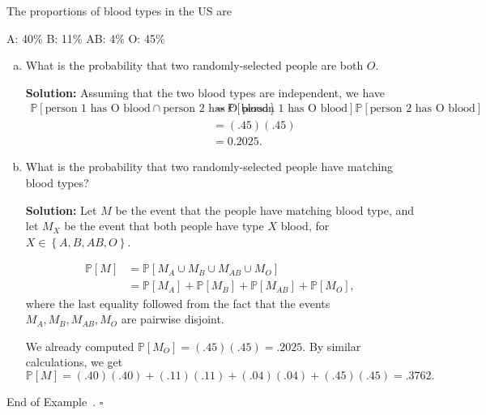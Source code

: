 \documentclass[10pt]{article}
\theoremstyle{definition}
\newtheorem{example}[theorem]{Example}
\renewenvironment{example}
{\begin{oldexample}}
  {\par\smallskip\hfill   End of Example~\theexample. $\square$    \par\end{oldexample}}
\newcommand{\fl}{\noindent\textbf} %
\newcommand{\1}[1]{\textbf{1}_{\left[#1\right]}} %
\def\P{\mathbb{P}} %
\begin{document}

\begin{example}
  The proportions of blood types in the US are
  \begin{center}
    A: 40\% \quad  B: 11\% \quad AB: 4\% \quad O: 45\%
  \end{center}
  \begin{enumerate}[(a)]
    \item What is the probability that two randomly-selected people are both
    $O$.
    
    \fl{Solution:} Assuming that the two blood types are independent, we have
    \begin{align*}
      \P\left[ \text{person 1 has O blood} \cap \text{person 2 has O blood}
      \right] 
      &= \P\left[\text{person 1 has O blood} \right]
        \P\left[\text{person 2 has O blood} \right] \\
      &= (.45)(.45) \\
      &= 0.2025.
    \end{align*}
    \item What is the probability that two randomly-selected people have
    matching blood types?
    
    \fl{Solution:} Let $M$ be the event that the people have matching blood
    type, and let $M_{X}$ be the event that both people have type $X$
    blood, for $X\in \left\{A,B,AB,O\right\}$.

    \begin{align*}
      \P\left[M \right] 
      &= \P\left[M_{A}\cup M_{B}\cup M_{AB}\cup M_{O} \right]\\
      &= \P\left[M_{A} \right] + \P\left[M_{B} \right]+ \P\left[M_{AB} \right] + \P\left[M_{O} \right],
    \end{align*}
    where the last equality followed from the fact that the events
    $M_{A},M_{B},M_{AB},M_{O}$ are pairwise disjoint.
    
    We already computed $\P\left[M_{O} \right]= (.45)(.45) = .2025$. By similar calculations,
    we get
    \begin{equation*}
      \P\left[M \right] = (.40)(.40)+(.11)(.11)+ (.04)(.04) + (.45)(.45) = .3762.
    \end{equation*}
  \end{enumerate}
\end{example}
\end{document}
